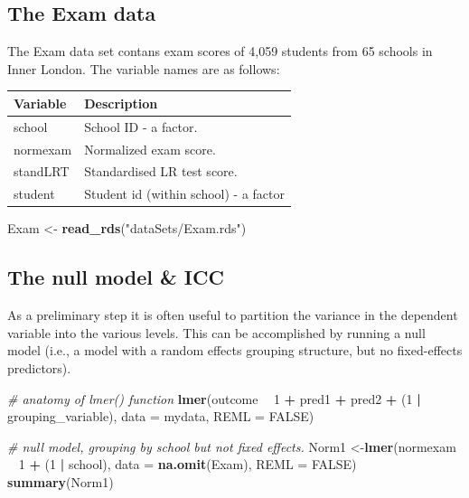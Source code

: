 \documentclass[
]{book}
\newenvironment{Shaded}{\begin{snugshade}}{\end{snugshade}}
\newcommand{\CommentTok}[1]{\textcolor[rgb]{0.56,0.35,0.01}{\textit{#1}}}
\newcommand{\DataTypeTok}[1]{\textcolor[rgb]{0.13,0.29,0.53}{#1}}
\newcommand{\DecValTok}[1]{\textcolor[rgb]{0.00,0.00,0.81}{#1}}
\newcommand{\KeywordTok}[1]{\textcolor[rgb]{0.13,0.29,0.53}{\textbf{#1}}}
\newcommand{\NormalTok}[1]{#1}
\newcommand{\OperatorTok}[1]{\textcolor[rgb]{0.81,0.36,0.00}{\textbf{#1}}}
\newcommand{\OtherTok}[1]{\textcolor[rgb]{0.56,0.35,0.01}{#1}}
\newcommand{\StringTok}[1]{\textcolor[rgb]{0.31,0.60,0.02}{#1}}
\begin{document}
\hypertarget{the-exam-data}{%
\subsection{The Exam data}\label{the-exam-data}}

The Exam data set contans exam scores of 4,059 students from 65 schools in Inner London. The variable names are as follows:

\begin{longtable}[]{@{}ll@{}}
\toprule
Variable & Description\tabularnewline
\midrule
\endhead
school & School ID - a factor.\tabularnewline
normexam & Normalized exam score.\tabularnewline
standLRT & Standardised LR test score.\tabularnewline
student & Student id (within school) - a factor\tabularnewline
\bottomrule
\end{longtable}

\begin{Shaded}
\begin{Highlighting}[]
\NormalTok{  Exam <-}\StringTok{ }\KeywordTok{read_rds}\NormalTok{(}\StringTok{"dataSets/Exam.rds"}\NormalTok{)}
\end{Highlighting}
\end{Shaded}

\hypertarget{the-null-model-icc}{%
\subsection{The null model \& ICC}\label{the-null-model-icc}}

As a preliminary step it is often useful to partition the variance in the dependent variable into the various levels. This can be accomplished by running a null model (i.e., a model with a random effects grouping structure, but no fixed-effects predictors).

\begin{Shaded}
\begin{Highlighting}[]
  \CommentTok{# anatomy of lmer() function}
  \KeywordTok{lmer}\NormalTok{(outcome }\OperatorTok{~}\StringTok{ }\DecValTok{1} \OperatorTok{+}\StringTok{ }\NormalTok{pred1 }\OperatorTok{+}\StringTok{ }\NormalTok{pred2 }\OperatorTok{+}\StringTok{ }\NormalTok{(}\DecValTok{1} \OperatorTok{|}\StringTok{ }\NormalTok{grouping_variable), }
       \DataTypeTok{data =}\NormalTok{ mydata, }
       \DataTypeTok{REML =} \OtherTok{FALSE}\NormalTok{)}
\end{Highlighting}
\end{Shaded}

\begin{Shaded}
\begin{Highlighting}[]
  \CommentTok{# null model, grouping by school but not fixed effects.}
\NormalTok{  Norm1 <-}\KeywordTok{lmer}\NormalTok{(normexam }\OperatorTok{~}\StringTok{ }\DecValTok{1} \OperatorTok{+}\StringTok{ }\NormalTok{(}\DecValTok{1} \OperatorTok{|}\StringTok{ }\NormalTok{school), }
              \DataTypeTok{data =} \KeywordTok{na.omit}\NormalTok{(Exam), }\DataTypeTok{REML =} \OtherTok{FALSE}\NormalTok{)}
  \KeywordTok{summary}\NormalTok{(Norm1)}
\end{Highlighting}
\end{Shaded}
\end{document}
